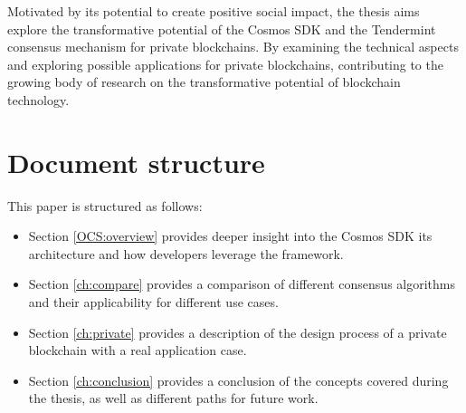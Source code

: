 Motivated by its potential to create positive social impact, the thesis aims explore the transformative potential of the Cosmos SDK and the Tendermint consensus mechanism for private blockchains. By examining the technical aspects and exploring possible applications for private blockchains, contributing to the growing body of research on the transformative potential of blockchain technology.

\section{Document structure}

This paper is structured as follows:

\begin{itemize}
    \item Section \ref{OCS:overview} provides deeper insight into the Cosmos SDK its architecture and how developers leverage the framework.
    \item Section \ref{ch:compare} provides a comparison of different consensus algorithms and their applicability for different use cases.
    \item Section \ref{ch:private} provides a description of the design process of a private blockchain with a real application case.
    \item Section \ref{ch:conclusion} provides  a conclusion of the concepts covered during the thesis, as well as different paths for future work.
\end{itemize}

